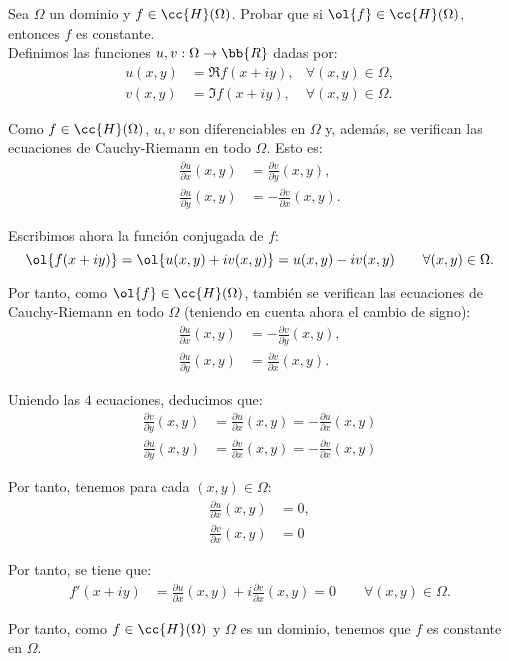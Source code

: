 \begin{ejercicio}
    Sea $\Omega$ un dominio y $f \in \cc{H}(\Omega)$. Probar que si $\ol{f} \in \cc{H}(\Omega)$, entonces $f$ es constante.\\

    Definimos las funciones $u,v:\Omega\to\bb{R}$ dadas por:
    \begin{align*}
        u(x,y) &= \Re f(x+iy),&\forall (x,y)\in\Omega,\\
        v(x,y) &= \Im f(x+iy),&\forall (x,y)\in\Omega.
    \end{align*}

    Como $f\in \cc{H}(\Omega)$, $u,v$ son diferenciables en $\Omega$ y, además, se verifican las ecuaciones de Cauchy-Riemann en todo $\Omega$. Esto es:
    \begin{align*}
        \frac{\partial u}{\partial x}(x,y) &= \frac{\partial v}{\partial y}(x,y),\\
        \frac{\partial u}{\partial y}(x,y) &= -\frac{\partial v}{\partial x}(x,y).
    \end{align*}

    Escribimos ahora la función conjugada de $f$:
    \[
        \ol{f(x+iy)} = \ol{u(x,y) + iv(x,y)} = u(x,y) - iv(x,y)\qquad \forall (x,y)\in\Omega.
    \]

    Por tanto, como $\ol{f}\in \cc{H}(\Omega)$, también se verifican las ecuaciones de Cauchy-Riemann en todo $\Omega$ (teniendo en cuenta ahora el cambio de signo):
    \begin{align*}
        \frac{\partial u}{\partial x}(x,y) &= -\frac{\partial v}{\partial y}(x,y),\\
        \frac{\partial u}{\partial y}(x,y) &= \frac{\partial v}{\partial x}(x,y).
    \end{align*}

    Uniendo las $4$ ecuaciones, deducimos que:
    \begin{align*}
        \frac{\partial v}{\partial y}(x,y) &= \frac{\partial u}{\partial x}(x,y) = -\frac{\partial u}{\partial x}(x,y)\\
        \frac{\partial u}{\partial y}(x,y) &= \frac{\partial v}{\partial x}(x,y) = - \frac{\partial v}{\partial x}(x,y)
    \end{align*}

    Por tanto, tenemos para cada $(x,y)\in\Omega$:
    \begin{align*}
        \frac{\partial u}{\partial x}(x,y) &= 0,\\
        \frac{\partial v}{\partial x}(x,y) &= 0
    \end{align*}

    Por tanto, se tiene que:
    \begin{align*}
        f'(x+iy) &= \frac{\partial u}{\partial x}(x,y) + i\frac{\partial v}{\partial x}(x,y) = 0\qquad \forall (x,y)\in\Omega.
    \end{align*}

    Por tanto, como $f\in \cc{H}(\Omega)$ y $\Omega$ es un dominio, tenemos que $f$ es constante en $\Omega$.
\end{ejercicio}

